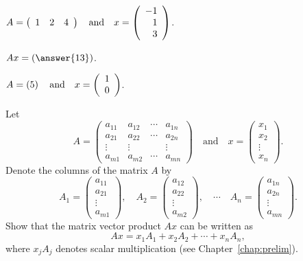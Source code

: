 \documentclass{ximera}
\begin{document}
\begin{exercise} \label{c4.1.a3c}
$A=\left(\begin{array}{rrr} 1 & 2 & 4 \end{array}\right) \quad\mbox{and}\quad
x = \left(\begin{array}{r} -1\\ 1 \\3\end{array}\right)$.
  \begin{multipleChoice}
  \end{multipleChoice}
  \begin{exercise}
    $Ax = \left(\answer{13}\right)$.
  \end{exercise}
\end{exercise}

\begin{exercise} \label{c4.1.a3d}
  $A=\left(5\right) \quad\mbox{and}\quad x = \left(\begin{array}{r} 1 \\ 0\end{array}\right)$.
  \begin{multipleChoice}
  \end{multipleChoice}  
\end{exercise}

\begin{exercise} \label{c4.1.b3}
Let
\[
A=\left(
\begin{array}{rrrr}
 a_{11} & a_{12} & \cdots & a_{1n} \\
 a_{21} & a_{22} & \cdots & a_{2n}  \\
 \vdots & \vdots &        & \vdots  \\
 a_{m1} & a_{m2} & \cdots & a_{mn}
\end{array}
\right)\quad\mbox{and}\quad
x =
\left( \begin{array}{r} x_1\\ x_2\\ \vdots\\ x_n\end{array}\right).
\]
Denote the columns of the matrix $A$ by
\[
A_1 =
\left(\begin{array}{c} a_{11}\\ a_{21}\\ \vdots\\
a_{m1}\end{array}\right),\quad
A_2 =
\left(\begin{array}{c} a_{12}\\ a_{22}\\ \vdots\\
a_{m2}\end{array}\right),\quad
\cdots\quad
A_n =
\left(\begin{array}{c} a_{1n}\\ a_{2n}\\ \vdots\\ a_{mn}\end{array}\right).
\]
Show that the matrix vector product $Ax$ can be written as
\[
Ax = x_1 A_1 + x_2 A_2 + \cdots + x_n A_n,
\]
where $x_j A_j$ denotes scalar multiplication (see Chapter~\ref{chap:prelim}).
\end{exercise}
\end{document}
